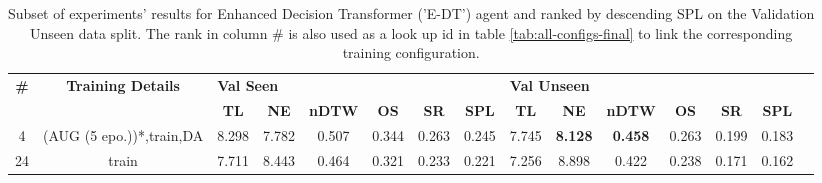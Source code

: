 \begin{table}
\centering
\caption{\label{tab:e_dt_final}Subset of experiments' results for Enhanced Decision Transformer ('E-DT') agent and ranked by descending SPL on the Validation Unseen data split. The rank in column \# is also used as a look up id in table \ref{tab:all-configs-final} to link the corresponding training configuration.}
\begin{tabular}{@{\hskip3pt}c@{\hskip3pt}c@{\hskip3pt}c@{\hskip3pt}c@{\hskip3pt}c@{\hskip3pt}c@{\hskip3pt}c@{\hskip3pt}c@{\hskip3pt}c@{\hskip3pt}c@{\hskip3pt}c@{\hskip3pt}c@{\hskip3pt}c@{\hskip3pt}c@{\hskip3pt}c}
\toprule
\textbf{\#} & \textbf{Training Details} & \multicolumn{6}{l}{\textbf{Val Seen}} & \multicolumn{6}{l}{\textbf{Val Unseen}} \\
 \textbf{~} &                \textbf{~} &       \textbf{TL} & \textbf{NE} & \textbf{nDTW} & \textbf{OS} & \textbf{SR} & \textbf{SPL} &         \textbf{TL} &     \textbf{NE} &   \textbf{nDTW} & \textbf{OS} & \textbf{SR} & \textbf{SPL} \\
\midrule
          4 &  (AUG (5 epo.))*,train,DA &             8.298 &       7.782 &         0.507 &       0.344 &       0.263 &        0.245 &               7.745 &  \textbf{8.128} &  \textbf{0.458} &       0.263 &       0.199 &        0.183 \\
         24 &                     train &             7.711 &       8.443 &         0.464 &       0.321 &       0.233 &        0.221 &               7.256 &           8.898 &           0.422 &       0.238 &       0.171 &        0.162 \\
\bottomrule
\end{tabular}
\end{table}
